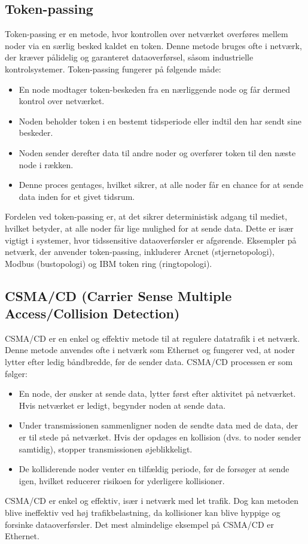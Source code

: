 \subsection{Token-passing}
Token-passing er en metode, hvor kontrollen over netværket overføres mellem noder via en særlig besked kaldet en token. Denne metode bruges ofte i netværk, der kræver pålidelig og garanteret dataoverførsel, såsom industrielle kontrolsystemer. Token-passing fungerer på følgende måde:
\begin{itemize}
	\item En node modtager token-beskeden fra en nærliggende node og får dermed kontrol over netværket.
	\item Noden beholder token i en bestemt tidsperiode eller indtil den har sendt sine beskeder.
	\item Noden sender derefter data til andre noder og overfører token til den næste node i rækken.
	\item Denne proces gentages, hvilket sikrer, at alle noder får en chance for at sende data inden for et givet tidsrum.
\end{itemize}
Fordelen ved token-passing er, at det sikrer deterministisk adgang til mediet, hvilket betyder, at alle noder får lige mulighed for at sende data. Dette er især vigtigt i systemer, hvor tidssensitive dataoverførsler er afgørende. Eksempler på netværk, der anvender token-passing, inkluderer Arcnet (stjernetopologi), Modbus (bustopologi) og IBM token ring (ringtopologi).

\subsection{CSMA/CD (Carrier Sense Multiple Access/Collision Detection)}
CSMA/CD er en enkel og effektiv metode til at regulere datatrafik i et netværk. Denne metode anvendes ofte i netværk som Ethernet og fungerer ved, at noder lytter efter ledig båndbredde, før de sender data. CSMA/CD processen er som følger:
\begin{itemize}
	\item En node, der ønsker at sende data, lytter først efter aktivitet på netværket. Hvis netværket er ledigt, begynder noden at sende data.
	\item Under transmissionen sammenligner noden de sendte data med de data, der er til stede på netværket. Hvis der opdages en kollision (dvs. to noder sender samtidig), stopper transmissionen øjeblikkeligt.
	\item De kolliderende noder venter en tilfældig periode, før de forsøger at sende igen, hvilket reducerer risikoen for yderligere kollisioner.
\end{itemize}
CSMA/CD er enkel og effektiv, især i netværk med let trafik. Dog kan metoden blive ineffektiv ved høj trafikbelastning, da kollisioner kan blive hyppige og forsinke dataoverførsler. Det mest almindelige eksempel på CSMA/CD er Ethernet.

